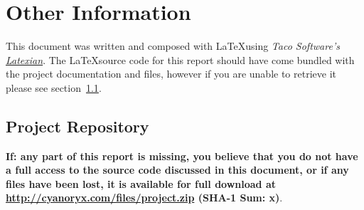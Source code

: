 \section{Other Information}

This document was written and composed with \LaTeX using \emph{Taco Software's \href{http://tacosw.com/latexian/}{Latexian}}. The \LaTeX source code for this report should have come bundled with the project documentation and files, however if you are unable to retrieve it please see section~\ref{sec:repo}.

\subsection{Project Repository} \label{sec:repo}

\textbf{If: any part of this report is missing, you believe that you do not have a full access to the source code discussed in this document, or if any files have been lost, it is available for full download at \url{http://cyanoryx.com/files/project.zip} (SHA-1 Sum: x)}.